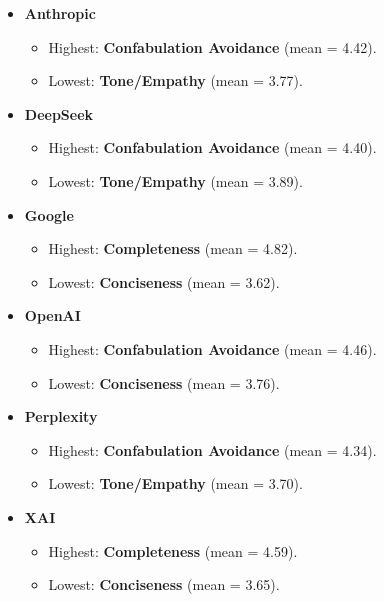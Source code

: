 \documentclass[
  11pt]{report}
\providecommand{\tightlist}{%
  \setlength{\itemsep}{0pt}\setlength{\parskip}{0pt}}\usepackage{longtable,booktabs,array}
\begin{document}
\begin{itemize}
\item
  \textbf{Anthropic}

  \begin{itemize}
  \tightlist
  \item
    Highest: \textbf{Confabulation Avoidance} (mean = 4.42).
  \item
    Lowest: \textbf{Tone/Empathy} (mean = 3.77).
  \end{itemize}
\item
  \textbf{DeepSeek}

  \begin{itemize}
  \tightlist
  \item
    Highest: \textbf{Confabulation Avoidance} (mean = 4.40).
  \item
    Lowest: \textbf{Tone/Empathy} (mean = 3.89).
  \end{itemize}
\item
  \textbf{Google}

  \begin{itemize}
  \tightlist
  \item
    Highest: \textbf{Completeness} (mean = 4.82).
  \item
    Lowest: \textbf{Conciseness} (mean = 3.62).
  \end{itemize}
\item
  \textbf{OpenAI}

  \begin{itemize}
  \tightlist
  \item
    Highest: \textbf{Confabulation Avoidance} (mean = 4.46).
  \item
    Lowest: \textbf{Conciseness} (mean = 3.76).
  \end{itemize}
\item
  \textbf{Perplexity}

  \begin{itemize}
  \tightlist
  \item
    Highest: \textbf{Confabulation Avoidance} (mean = 4.34).
  \item
    Lowest: \textbf{Tone/Empathy} (mean = 3.70).
  \end{itemize}
\item
  \textbf{XAI}

  \begin{itemize}
  \tightlist
  \item
    Highest: \textbf{Completeness} (mean = 4.59).
  \item
    Lowest: \textbf{Conciseness} (mean = 3.65).
  \end{itemize}
\end{itemize}
\end{document}
